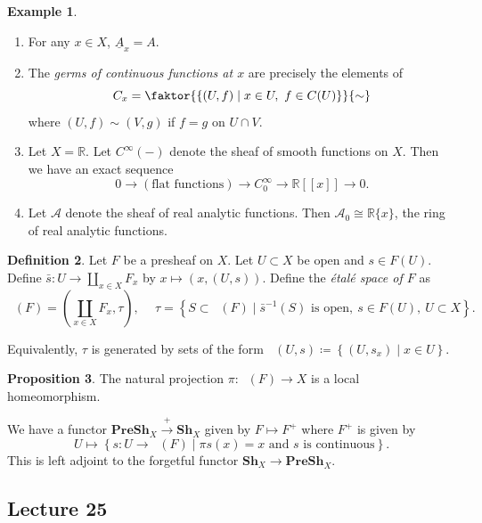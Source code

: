 \documentclass[10pt,letterpaper,cm]{nupset}
\theoremstyle{definition}
\newtheorem{definition}{Definition}[subsection]
\newtheorem{exmp}[definition]{Example}
\theoremstyle{theorem}
\newtheorem{prop}[definition]{Proposition}
\theoremstyle{remark}
\newcommand{\R}{\mathbb{R}}
\newcommand{\1}{\mathbb{1}}
\newcommand{\0}{\vec 0}
\DeclareMathOperator{\Et}{\acute{E}t}
\begin{document}
\begin{exmp} $ $
\begin{enumerate}
\item For any $x \in X$, $\underline{A}_x =A$.
\item The \textit{germs of continuous functions at $x$} are precisely the elements of $$C_x = \faktor{  \left\{(U, f) \mid x\in U, \ f \in C(U)\right\}    }{\sim}$$ where $\left(U, f\right) \sim \left(V, g\right)$ if $f =g$ on $U \cap V$.
\item Let $X = \R$. Let $C^{\infty}({-})$ denote the sheaf of smooth functions on $X$. Then we have an exact sequence $$ 0 \to \left(\text{flat functions}\right) \to C_0^{\infty} \to \R[\![x]\!] \to 0   .$$
\item Let $\mathcal{A}$ denote the sheaf of real analytic functions. Then $\mathcal{A}_0 \cong \R\{x\}$, the ring of real analytic functions.
\end{enumerate}
\end{exmp}

\begin{definition}
Let $F$ be a presheaf on $X$. Let $U \subset X$ be open and $s \in F(U)$. Define $\bar{s} : U \to  \coprod_{x\in X} F_x$ by $x \mapsto \left(x, \left(U, s\right)\right)$. Define the \textit{\'etal\'e space of $F$} as $$\Et(F)   =  \left(\coprod_{x\in X} F_x, \tau \right), \ \quad \tau =\left\{S \subset \Et(F) \mid \bar{s}^{-1}(S) \text{ is open}, \ s \in F(U), \ U\subset X \right\}.    $$ 
\end{definition}

Equivalently, $\tau$ is generated by sets of the form $\Et(U, s) \coloneqq  \left\{\left(U, s_x\right) \mid x \in U\right\}$.

\begin{prop}
The natural projection $\pi : \Et(F) \to X$ is a local homeomorphism. 
\end{prop}

\smallskip

We have a functor $\mathbf{PreSh}_X \overset{+}{\longrightarrow} \mathbf{Sh}_{X}$ given by $F \mapsto F^{+}$ where $F^{+}$ is given by $$U \mapsto\left \{s : U \to \Et(F) \mid \pi s(x) = x \text{ and } s \text{ is continuous}\right\}  .$$ This is left adjoint to the forgetful functor $\mathbf{Sh}_{X} \to \mathbf{PreSh}_X$.


\subsection{Lecture 25}
\end{document}
